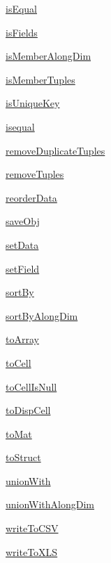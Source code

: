 \begin{list}{}{}
 \item \hyperref[method:smartdb.relations.ATypifiedStaticRelation.isEqual]{isEqual}
 \item \hyperref[method:smartdb.relations.ATypifiedStaticRelation.isFields]{isFields}
 \item \hyperref[method:smartdb.relations.ATypifiedStaticRelation.isMemberAlongDim]{isMemberAlongDim}
 \item \hyperref[method:smartdb.relations.ATypifiedStaticRelation.isMemberTuples]{isMemberTuples}
 \item \hyperref[method:smartdb.relations.ATypifiedStaticRelation.isUniqueKey]{isUniqueKey}
 \item \hyperref[method:smartdb.relations.ATypifiedStaticRelation.isequal]{isequal}
 \item \hyperref[method:smartdb.relations.ATypifiedStaticRelation.removeDuplicateTuples]{removeDuplicateTuples}
 \item \hyperref[method:smartdb.relations.ATypifiedStaticRelation.removeTuples]{removeTuples}
 \item \hyperref[method:smartdb.relations.ATypifiedStaticRelation.reorderData]{reorderData}
 \item \hyperref[method:smartdb.relations.ATypifiedStaticRelation.saveObj]{saveObj}
 \item \hyperref[method:smartdb.relations.ATypifiedStaticRelation.setData]{setData}
 \item \hyperref[method:smartdb.relations.ATypifiedStaticRelation.setField]{setField}
 \item \hyperref[method:smartdb.relations.ATypifiedStaticRelation.sortBy]{sortBy}
 \item \hyperref[method:smartdb.relations.ATypifiedStaticRelation.sortByAlongDim]{sortByAlongDim}
 \item \hyperref[method:smartdb.relations.ATypifiedStaticRelation.toArray]{toArray}
 \item \hyperref[method:smartdb.relations.ATypifiedStaticRelation.toCell]{toCell}
 \item \hyperref[method:smartdb.relations.ATypifiedStaticRelation.toCellIsNull]{toCellIsNull}
 \item \hyperref[method:smartdb.relations.ATypifiedStaticRelation.toDispCell]{toDispCell}
 \item \hyperref[method:smartdb.relations.ATypifiedStaticRelation.toMat]{toMat}
 \item \hyperref[method:smartdb.relations.ATypifiedStaticRelation.toStruct]{toStruct}
 \item \hyperref[method:smartdb.relations.ATypifiedStaticRelation.unionWith]{unionWith}
 \item \hyperref[method:smartdb.relations.ATypifiedStaticRelation.unionWithAlongDim]{unionWithAlongDim}
 \item \hyperref[method:smartdb.relations.ATypifiedStaticRelation.writeToCSV]{writeToCSV}
 \item \hyperref[method:smartdb.relations.ATypifiedStaticRelation.writeToXLS]{writeToXLS}
\end{list}
